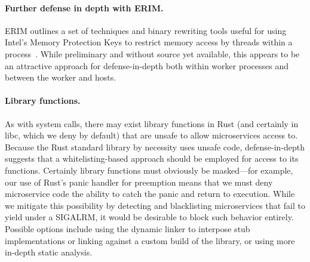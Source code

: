 \paragraph{Further defense in depth with ERIM.}
ERIM outlines a set of techniques and binary rewriting tools useful for using
Intel's Memory Protection Keys to restrict memory access by 
threads within a process~\cite{vahldiek2018erim}.  While preliminary and without
source yet available, this appears to be an attractive approach for
defense-in-depth both within worker processes and between the worker and hosts.



\paragraph{Library functions.}
As with system calls, there may exist library functions in Rust (and certainly
in libc, which we deny by default) that are unsafe to allow microservices 
access to.  Because the Rust standard library by necessity uses unsafe
code,  defense-in-depth suggests that a whitelisting-based approach should be
employed for access to its functions.  Certainly library functions must
obviously be masked---for example, our use of Rust's panic handler for
preemption means that we must deny microservice code the ability to catch the
panic and return to execution.  While we mitigate this possibility by
detecting and blacklisting microservices that fail to yield under a SIGALRM, it
would be desirable to block such behavior entirely.
Possible
options include using the dynamic linker to interpose stub implementations or
linking against a custom build of the library, or using more in-depth static analysis.




